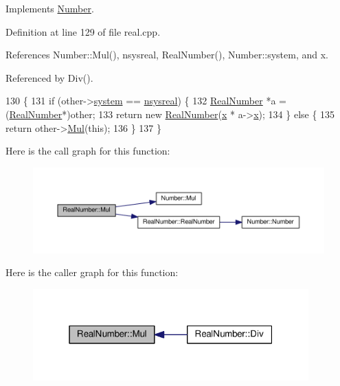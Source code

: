 Implements \hyperlink{structNumber_ab853199817c9cd4e43c43aaedc4eef35}{Number}.



Definition at line 129 of file real.\+cpp.



References Number\+::\+Mul(), nsysreal, Real\+Number(), Number\+::system, and x.



Referenced by Div().


\begin{DoxyCode}
130 \{
131     \textcolor{keywordflow}{if} (other->\hyperlink{structNumber_a2ceda5601c42288626e76b06878e7476}{system} == \hyperlink{numb_8h_a1475a201d2346881ce88dfbacf628c7dae72cf8673109b15268d1c0837e8bff86}{nsysreal}) \{
132         \hyperlink{structRealNumber}{RealNumber} *a = (\hyperlink{structRealNumber}{RealNumber}*)other;
133         \textcolor{keywordflow}{return} \textcolor{keyword}{new} \hyperlink{structRealNumber_aa61264f519c95ec9b63ab94c352bcc67}{RealNumber}(\hyperlink{structRealNumber_ac33d80bee75448490199a0aa48ccce1e}{x} * a->\hyperlink{structRealNumber_ac33d80bee75448490199a0aa48ccce1e}{x});
134     \} \textcolor{keywordflow}{else} \{
135         \textcolor{keywordflow}{return} other->\hyperlink{structNumber_ab853199817c9cd4e43c43aaedc4eef35}{Mul}(\textcolor{keyword}{this});
136     \}
137 \}
\end{DoxyCode}


Here is the call graph for this function\+:\nopagebreak
\begin{figure}[H]
\begin{center}
\leavevmode
\includegraphics[width=350pt]{structRealNumber_af5491d836bb591e1291f4f9eee809902_cgraph}
\end{center}
\end{figure}




Here is the caller graph for this function\+:\nopagebreak
\begin{figure}[H]
\begin{center}
\leavevmode
\includegraphics[width=301pt]{structRealNumber_af5491d836bb591e1291f4f9eee809902_icgraph}
\end{center}
\end{figure}



